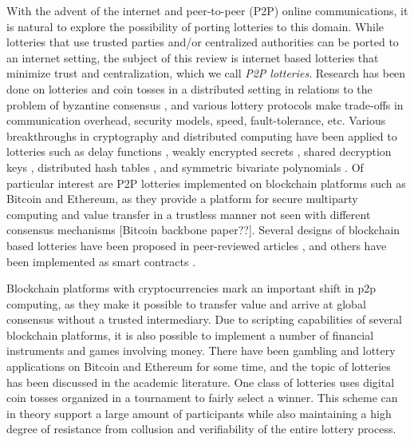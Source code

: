 With the advent of the internet and peer-to-peer (P2P) online communications, it is natural to explore the possibility of porting lotteries to this domain. While lotteries that use trusted parties and/or centralized authorities can be ported to an internet setting, the subject of this review is internet based lotteries that minimize trust and centralization, which we call \emph{P2P lotteries}. Research has been done on lotteries and coin tosses in a distributed setting in relations to the problem of byzantine consensus \cite{broder_provably_1985}, and various lottery protocols make trade-offs in communication overhead, security models, speed, fault-tolerance, etc. Various breakthroughs in cryptography and distributed computing have been applied to lotteries such as delay functions \cite{goldschlag_publicly_1998}, weakly encrypted secrets \cite{syverson_weakly_1998}, shared decryption keys \cite{fouque_sharing_2001}, distributed hash tables \cite{grumbach_distributed_2017}, and symmetric bivariate polynomials \cite{xia_information_2019}. Of particular interest are P2P lotteries implemented on blockchain platforms such as Bitcoin and Ethereum, as they provide a platform for secure multiparty computing \cite{andrychowicz_secure_2014} and value transfer in a trustless manner not seen with different consensus mechanisms [Bitcoin backbone paper??]. Several designs of blockchain based lotteries have been proposed in peer-reviewed articles \cite{bartoletti_constant-deposit_2017} \cite{miller_zero-collateral_2017} \cite{andrychowicz_secure_2014} \cite{liao_design_2017} \cite{back_note_2014}, and others have been implemented as smart contracts \cite{ago_fairlotto_2018} \cite{noauthor_smartbillions_nodate} \cite{noauthor_satoshi_nodate}.

Blockchain platforms with cryptocurrencies mark an important shift in p2p computing, as they make it possible to transfer value and arrive at global consensus without a trusted intermediary. Due to scripting capabilities of several blockchain platforms, it is also possible to implement a number of financial instruments and games involving money. There have been gambling and lottery applications on Bitcoin and Ethereum for some time, and the topic of lotteries has been discussed in the academic literature. One class of lotteries uses digital coin tosses organized in a tournament to fairly select a winner. This scheme can in theory support a large amount of participants while also maintaining a high degree of resistance from collusion and verifiability of the entire lottery process.

